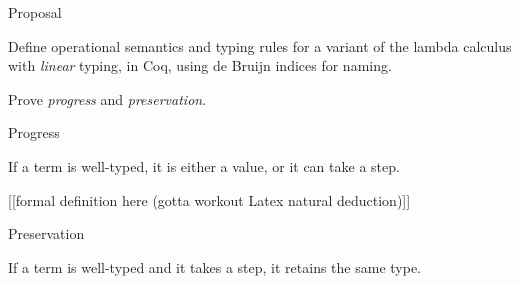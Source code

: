 \documentclass[10pt]{beamer}
\begin{document}
\begin{frame}{Proposal}

Define operational semantics and typing rules for a variant of the lambda calculus with \textit{linear} typing, in Coq, using de Bruijn indices for naming.

Prove \textit{progress} and \textit{preservation}.
\end{frame}

\begin{frame}{Progress}

If a term is well-typed, it is either a value, or it can take a step.

[[formal definition here (gotta workout Latex natural deduction)]]
\end{frame}

\begin{frame}{Preservation}

If a term is well-typed and it takes a step, it retains the same type.

\end{frame}
\end{document}
